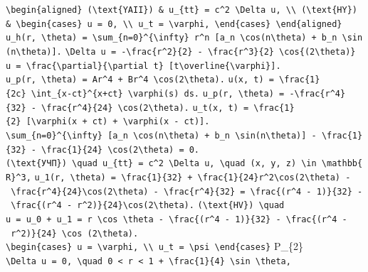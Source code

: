 \documentclass[
  ukrainian,
]{article}
\begin{document}
\texttt{\textbackslash{}begin\{aligned\}\ (\textbackslash{}text\{YAII\})\ \&\ u\_\{tt\}\ =\ c\^{}2\ \textbackslash{}Delta\ u,\ \textbackslash{}\textbackslash{}\ (\textbackslash{}text\{HY\})\ \&\ \textbackslash{}begin\{cases\}\ u\ =\ 0,\ \textbackslash{}\textbackslash{}\ u\_t\ =\ \textbackslash{}varphi,\ \textbackslash{}end\{cases\}\ \textbackslash{}end\{aligned\}}
\texttt{u\_h(r,\ \textbackslash{}theta)\ =\ \textbackslash{}sum\_\{n=0\}\^{}\{\textbackslash{}infty\}\ r\^{}n\ {[}a\_n\ \textbackslash{}cos(n\textbackslash{}theta)\ +\ b\_n\ \textbackslash{}sin(n\textbackslash{}theta){]}.}
\texttt{\textbackslash{}Delta\ u\ =\ -\textbackslash{}frac\{r\^{}2\}\{2\}\ -\ \textbackslash{}frac\{r\^{}3\}\{2\}\ \textbackslash{}cos\{(2\textbackslash{}theta)\}}
\texttt{u\ =\ \textbackslash{}frac\{\textbackslash{}partial\}\{\textbackslash{}partial\ t\}\ {[}t\textbackslash{}overline\{\textbackslash{}varphi\}{]}.}
\texttt{u\_p(r,\ \textbackslash{}theta)\ =\ Ar\^{}4\ +\ Br\^{}4\ \textbackslash{}cos(2\textbackslash{}theta).}
\texttt{u(x,\ t)\ =\ \textbackslash{}frac\{1\}\{2c\}\ \textbackslash{}int\_\{x-ct\}\^{}\{x+ct\}\ \textbackslash{}varphi(s)\ ds.}
\texttt{u\_p(r,\ \textbackslash{}theta)\ =\ -\textbackslash{}frac\{r\^{}4\}\{32\}\ -\ \textbackslash{}frac\{r\^{}4\}\{24\}\ \textbackslash{}cos(2\textbackslash{}theta).}
\texttt{u\_t(x,\ t)\ =\ \textbackslash{}frac\{1\}\{2\}\ {[}\textbackslash{}varphi(x\ +\ ct)\ +\ \textbackslash{}varphi(x\ -\ ct){]}.}
\texttt{\textbackslash{}sum\_\{n=0\}\^{}\{\textbackslash{}infty\}\ {[}a\_n\ \textbackslash{}cos(n\textbackslash{}theta)\ +\ b\_n\ \textbackslash{}sin(n\textbackslash{}theta){]}\ -\ \textbackslash{}frac\{1\}\{32\}\ -\ \textbackslash{}frac\{1\}\{24\}\ \textbackslash{}cos(2\textbackslash{}theta)\ =\ 0.}
\texttt{(\textbackslash{}text\{УЧП\})\ \textbackslash{}quad\ u\_\{tt\}\ =\ c\^{}2\ \textbackslash{}Delta\ u,\ \textbackslash{}quad\ (x,\ y,\ z)\ \textbackslash{}in\ \textbackslash{}mathbb\{R\}\^{}3,}
\texttt{u\_1(r,\ \textbackslash{}theta)\ =\ \textbackslash{}frac\{1\}\{32\}\ +\ \textbackslash{}frac\{1\}\{24\}r\^{}2\textbackslash{}cos(2\textbackslash{}theta)\ -\ \textbackslash{}frac\{r\^{}4\}\{24\}\textbackslash{}cos(2\textbackslash{}theta)\ -\ \textbackslash{}frac\{r\^{}4\}\{32\}\ =\ \textbackslash{}frac\{(r\^{}4\ -\ 1)\}\{32\}\ -\ \textbackslash{}frac\{(r\^{}4\ -\ r\^{}2)\}\{24\}\textbackslash{}cos(2\textbackslash{}theta).}
\texttt{(\textbackslash{}text\{HV\})\ \textbackslash{}quad}
\texttt{u\ =\ u\_0\ +\ u\_1\ =\ r\ \textbackslash{}cos\ \textbackslash{}theta\ -\ \textbackslash{}frac\{(r\^{}4\ -\ 1)\}\{32\}\ -\ \textbackslash{}frac\{(r\^{}4\ -\ r\^{}2)\}\{24\}\ \textbackslash{}cos\ (2\textbackslash{}theta).}
\texttt{\textbackslash{}begin\{cases\}\ u\ =\ \textbackslash{}varphi,\ \textbackslash{}\textbackslash{}\ u\_t\ =\ \textbackslash{}psi\ \textbackslash{}end\{cases\}}
P\_\{2\}
\texttt{\textbackslash{}Delta\ u\ =\ 0,\ \textbackslash{}quad\ 0\ \textless{}\ r\ \textless{}\ 1\ +\ \textbackslash{}frac\{1\}\{4\}\ \textbackslash{}sin\ \textbackslash{}theta,}
\end{document}

